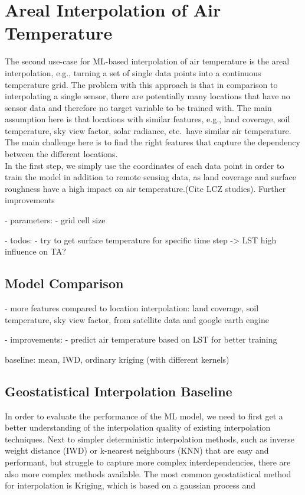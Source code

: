 \section{Areal Interpolation of Air Temperature}

The second use-case for ML-based interpolation of air temperature is the areal interpolation, e.g., turning a set of single data points into a continuous temperature grid. The problem with this approach is that in comparison to interpolating a single sensor, there are potentially many locations that have no sensor data and therefore no target variable to be trained with. The main assumption here is that locations with similar features, e.g., land coverage, soil temperature, sky view factor, solar radiance, etc.\ have similar air temperature. The main challenge here is to find the right features that capture the dependency between the different locations.\\
In the first step, we simply use the coordinates of each data point in order to train the model in addition to remote sensing data, as land coverage and surface roughness have a high impact on air temperature.(Cite LCZ studies).
Further improvements

- parameters:
  - grid cell size

- todos:
  - try to get surface temperature for specific time step -> LST high influence on TA?

\subsection{Model Comparison}

- more features compared to location interpolation: land coverage, soil temperature, sky view factor, from satellite data and google earth engine

- improvements:
  - predict air temperature based on LST for better training

baseline: mean, IWD, ordinary kriging (with different kernels)

\subsection{Geostatistical Interpolation Baseline}
In order to evaluate the performance of the ML model, we need to first get a better understanding of the interpolation quality of existing interpolation techniques. Next to simpler deterministic interpolation methods, such as inverse weight distance (IWD) or k-nearest neighbours (KNN) that are easy and performant, but struggle to capture more complex interdependencies, there are also more complex methods available. The most common geostatistical method for interpolation is Kriging, which is based on a gaussian process and 

